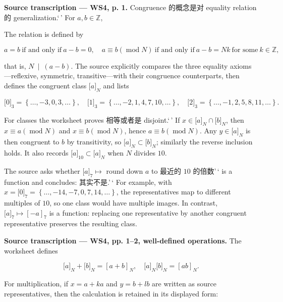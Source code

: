 \textbf{Source transcription --- WS4, p. 1.} Congruence 的概念是对 equality relation 的 generalization.`\,' For \(a,b \in \mathbb{Z}\),

The  relation is defined by

\[a = b\ \text{if and only if}\ a - b = 0,\quad a \equiv b\left( {\operatorname{mod}N} \right)\ \text{if and only if}\ a - b = Nk\ \text{for some}\ k \in \mathbb{Z},\]

that is, \(\left. N\  \middle| \ \left( {a - b} \right) \right.\). The source explicitly compares the three equality axioms---reflexive, symmetric, transitive---with their congruence counterparts, then defines the congruent class \(\lbrack a\rbrack_{N}\) and lists

\[\lbrack 0\rbrack_{3} = \left\{ {\ldots, - 3,0,3,\ldots} \right\},\quad\lbrack 1\rbrack_{3} = \left\{ {\ldots, - 2,1,4,7,10,\ldots} \right\},\quad\lbrack 2\rbrack_{3} = \left\{ {\ldots, - 1,2,5,8,11,\ldots} \right\}.\]

For classes the worksheet proves 相等或者是 disjoint.`\,' If \(x \in \lbrack a\rbrack_{N} \cap \lbrack b\rbrack_{N}\), then \(x \equiv a\left( {\operatorname{mod}N} \right)\) and \(x \equiv b\left( {\operatorname{mod}N} \right)\), hence \(a \equiv b\left( {\operatorname{mod}N} \right)\). Any \(y{\in \lbrack a\rbrack}_{N}\) is then congruent to \(b\) by transitivity, so \(\lbrack a\rbrack_{N} \subset \lbrack b\rbrack_{N}\); similarly the reverse inclusion holds. It also records \(\lbrack a\rbrack_{10} \subset \lbrack a\rbrack_{N}\) when \(N\) divides \(10\).

The source asks whether \(\lbrack a\rbrack_{7}\mapsto\) round down \(a\) to 最近的 \(10\) 的倍数'\,` is a function and concludes: 其实不是.'\,` For example, with \(x = \lbrack 0\rbrack_{7} = \left\{ {\ldots, - 14, - 7,0,7,14,\ldots} \right\}\), the representatives map to different multiples of \(10\), so one class would have multiple images. In contrast, \(\lbrack a\rbrack_{7}\mapsto\left\lbrack {- a} \right\rbrack_{7}\) is a function: replacing one representative by another congruent representative preserves the resulting class.

\textbf{Source transcription --- WS4, pp. 1--2, well-defined operations.} The worksheet defines

\[\lbrack a\rbrack_{N} + \lbrack b\rbrack_{N} = \left\lbrack {a + b} \right\rbrack_{N},\quad\lbrack a\rbrack_{N}\lbrack b\rbrack_{N} = \left\lbrack {ab} \right\rbrack_{N}.\]

For multiplication, if \(x = a + ka\) and \(y = b + lb\) are written as source representatives, then the calculation is retained in its displayed form:


